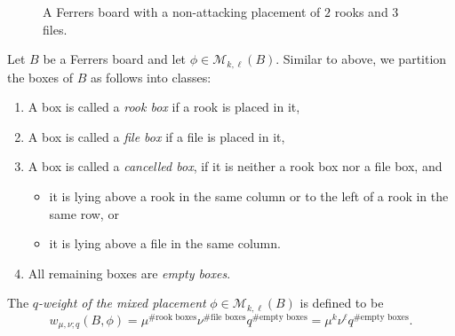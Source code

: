 \documentclass[10pt]{amsart}
\begin{document}
\begin{figure}[h]
\centering
{}
\caption{A Ferrers board with a non-attacking placement of $2$ rooks and 3 files.}\label{MixedPl}
\end{figure}

Let $B$ be a Ferrers board and let $\phi \in \mathcal{M}_{k,\ell}(B)$. Similar to above, we partition the boxes of $B$ as follows into classes:
\begin{enumerate}
\item A box is called a {\em rook box} if a rook is placed in it,
\item A box is called a {\em file box} if a file is placed in it,
\item A box is called a {\em cancelled box}, if it is neither a rook box nor a file box, and
\begin{itemize}
\item it is lying above a rook in the same column or to the left of a rook in the same row, or
\item it is lying above a file in the same column.
\end{itemize}
\item All remaining boxes are {\em empty boxes}. 
\end{enumerate}
The {\em $q$-weight of the mixed placement} $\phi \in \mathcal{M}_{k,\ell}(B)$ is defined to be 
\begin{equation}
w_{\mu,\nu;q}(B,\phi)=\mu^{\# \mbox{rook boxes}}\nu^{\# \mbox{file boxes}} q^{\# \mbox{empty boxes}}=\mu^{k}\nu^{\ell} q^{\# \mbox{empty boxes}}.
\end{equation}
\end{document}
